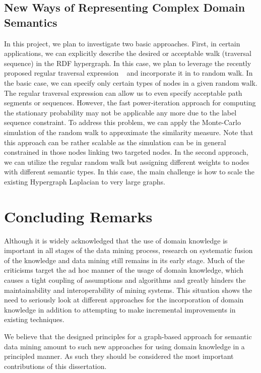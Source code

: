 \subsection{New Ways of Representing Complex Domain Semantics}
In this project, we plan to investigate two basic approaches.
First, in certain applications, we can explicitly describe the desired or acceptable walk (traversal sequence) in the RDF hypergraph. In this case, we plan to leverage the recently proposed regular traversal expression ~\cite{Marko10} and incorporate it in to random walk. In the basic case, we can specify only certain types of nodes in a given random walk. The regular traversal expression can allow us to even specify acceptable path segments or sequences.
However, the fast power-iteration approach for computing the stationary probability may not be applicable any more due to the label sequence constraint.
To address this problem, we can apply the Monte-Carlo simulation of the random walk to approximate the similarity measure. Note that this approach can be rather scalable as the simulation can be in general constrained in those nodes linking two targeted nodes.
In the second approach, we can utilize the regular random walk but assigning different  weights to nodes with different semantic types. In this case, the main challenge is how to scale the existing  Hypergraph Laplacian to very large graphs.

\section{Concluding Remarks}
Although it is widely acknowledged that the use of domain knowledge is important in all stages of the data mining process, research on systematic fusion of the knowledge and data mining still remains in its early stage. Much of the criticisms target the ad hoc manner of the usage of domain knowledge, which causes a tight coupling of assumptions and algorithms and greatly hinders the maintainability and interoperability of mining systems. This situation shows the need to seriously look at different approaches for the incorporation of domain knowledge in addition to attempting to make incremental improvements in existing techniques.

We believe that the designed principles for a graph-based approach for semantic data mining amount to such new approaches for using domain knowledge in a principled manner. As such they should be considered the most important contributions of this dissertation.